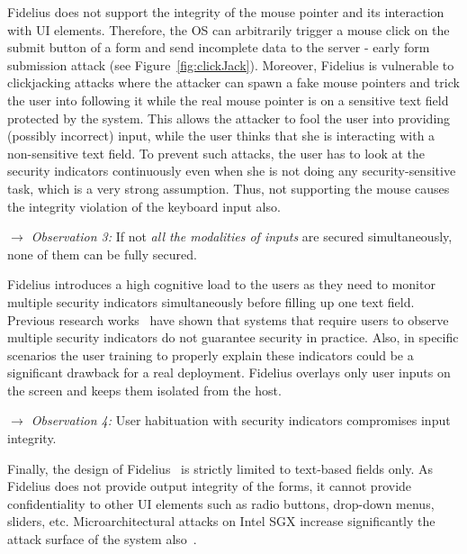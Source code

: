 Fidelius does not support the integrity of the mouse pointer and its interaction with UI elements. Therefore, the OS can arbitrarily trigger a mouse click on the submit button of a form and send incomplete data to the server - early form submission attack (see Figure~\ref{fig:clickJack}).
Moreover, Fidelius is vulnerable to clickjacking attacks where the attacker can spawn a fake mouse pointers and trick the user into following it while the real mouse pointer is on a sensitive text field protected by the system. This allows the attacker to fool the user into providing (possibly incorrect) input, while the user thinks that she is interacting with a non-sensitive text field. To prevent such attacks, the user has to look at the security indicators continuously even when she is not doing any security-sensitive task, which is a very strong assumption. 
Thus, not supporting the mouse causes the integrity violation of the keyboard input also.

\noindent\emph{$\rightarrow$ Observation 3:} If not \emph{all the modalities of inputs} are secured simultaneously, none of them can be fully secured. 

Fidelius introduces a high cognitive load to the users as they need to monitor multiple security indicators simultaneously before filling up one text field. Previous research works~\cite{egelman2008you,sobey2008exploring, anderson2016warning} have shown that systems that require users to observe multiple security indicators %
do not guarantee security in practice.
Also, in specific scenarios the user training to properly explain these indicators could be a significant drawback for a real deployment.
Fidelius overlays only user inputs on the screen and keeps them isolated from the host. 

\noindent\emph{$\rightarrow$ Observation 4:} User habituation with security indicators compromises input integrity. 


Finally, the design of Fidelius~\cite{Fidelius} is strictly limited to text-based fields only. As Fidelius does not provide output integrity of the forms, it cannot provide confidentiality to other UI elements such as radio buttons, drop-down menus, sliders, etc.
Microarchitectural attacks on Intel SGX increase significantly the attack surface of the system also~\cite{van2018foreshadow}.


